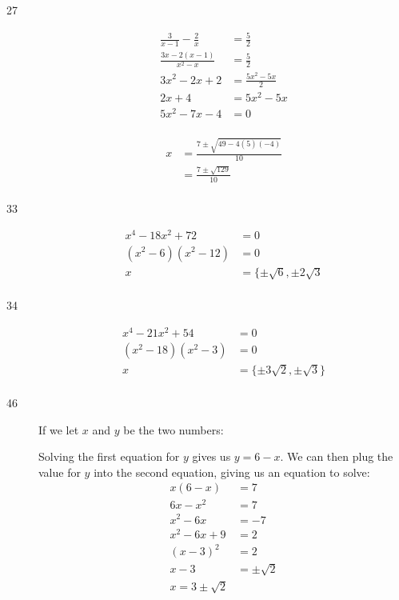 \documentclass[fleqn,addpoints]{exam}
\begin{document}
\begin{description}
\item[27]
\begin{align*}
  \frac{3}{x-1} - \frac{2}{x} &= \frac{5}{2} \\
  \frac{3x - 2(x-1)}{x^2-x} &= \frac{5}{2} \\
  3x^2-2x+2 &= \frac{5x^2 - 5x}{2} \\
  2x+4 &= 5x^2-5x \\
  5x^2-7x-4 &= 0 \\
\end{align*}

\begin{align*}
  x &= \frac{7 \pm \sqrt{49 - 4(5)(-4)}}{10} \\
  &= \frac{7 \pm \sqrt{129}}{10} \\
\end{align*}

\item[33]
\begin{align*}
  x^4 - 18x^2 + 72 &= 0 \\
  (x^2-6)(x^2-12) &= 0 \\
  x &= \{ \pm \sqrt{6}, \pm 2\sqrt{3} \\
\end{align*}

\item[34]
\begin{align*}
  x^4 - 21x^2+54 &= 0 \\
  (x^2-18)(x^2-3) &= 0 \\
  x &= \{ \pm 3\sqrt{2}, \pm \sqrt{3} \} \\
\end{align*}

\item[46] 
If we let $x$ and $y$ be the two numbers:

Solving the first equation for $y$ gives us $y = 6-x$.  We can then plug the value for $y$ into the second equation,
giving us an equation to solve:
\begin{align*}
  x(6-x) &= 7 \\
  6x-x^2 &= 7 \\
  x^2-6x &= -7 \\
  x^2-6x +9 &= 2 \\
  (x-3)^2 &= 2 \\
  x-3 &= \pm \sqrt{2} \\
  x = 3 \pm \sqrt{2}
\end{align*}


\end{description}
\end{document}
